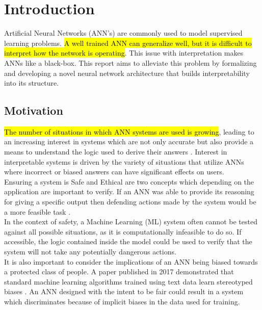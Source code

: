 \chapter{Introduction}\label{C:intro}

Artificial Neural Networks (ANN's) are commonly used to model supervised learning problems. \hl{A well trained ANN can generalize well, but it is difficult to interpret how the network is operating}. This issue with interpretation makes ANNs like a black-box. This report aims to alleviate this problem by formalizing and developing a novel neural network architecture that builds interpretability into its structure.

\section{Motivation}
\hl{The number of situations in which ANN systems are used is growing}, leading to an increasing interest in systems which are not only accurate but also provide a means to understand the logic used to derive their answers \cite{doshi2017towards}. Interest in interpretable systems is driven by the variety of situations that utilize ANNs where incorrect or biased answers can have significant effects on users.\\

Ensuring a system is Safe and Ethical are two concepts which depending on the application are important to verify. If an ANN was able to provide its reasoning for giving a specific output then defending actions made by the system would be a more feasible task \cite{doshi2017towards}.\\

In the context of safety, a Machine Learning (ML) system often cannot be tested against all possible situations, as it is computationally infeasible to do so. If accessible, the logic contained inside the model could be used to verify that the system will not take any potentially dangerous actions.\\

It is also important to consider the implications of an ANN being biased towards a protected class of people. A paper published in 2017 demonstrated that standard machine learning algorithms trained using text data learn stereotyped biases \cite{caliskan2017semantics}. An ANN designed with the intent to be fair could result in a system which discriminates because of implicit biases in the data used for training.\\

